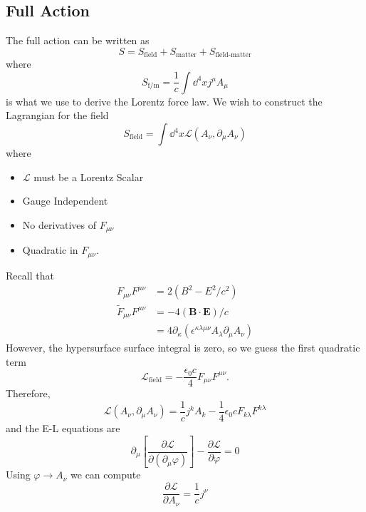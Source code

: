 \documentclass{article}
\numberwithin{equation}{section}
\begin{document}
\subsection{Full Action}
The full action can be written as 
\begin{equation}
    S = S_\text{field} + S_\text{matter} + S_\text{field-matter}
\end{equation}
where 
\begin{equation}
    S_\text{f/m} = \frac{1}{c} \int \dd^4 x j^\mu A_\mu
\end{equation}
is what we use to derive the Lorentz force law. We wish to construct the Lagrangian for the field 
\begin{equation}
    S_\text{field} = \int \dd^4 x \mathscr{L}(A_\nu, \partial_\mu A_\nu)
\end{equation}
where
\begin{itemize}
    \item $\mathscr{L}$ must be a Lorentz Scalar
    \item Gauge Independent
    \item No derivatives of $F_{\mu\nu}$
    \item Quadratic in $F_{\mu\nu}.$
\end{itemize}
Recall that
\begin{align}
    F_{\mu\nu}F^{\mu\nu} &= 2(B^2-E^2/c^2) \\ 
    \tilde{F}_{\mu\nu}F^{\mu\nu} &= - 4(\bm{B}\cdot \bm{E})/c \\ 
    &= 4\partial_\kappa (\epsilon^{\kappa \lambda \mu \nu} A_\lambda \partial_\mu A_\nu)
\end{align}
However, the hypersurface surface integral is zero, so we guess the first quadratic term
\begin{equation}
    \mathscr{L}_\text{field} = -\frac{\epsilon_0 c}{4} F_{\mu\nu}F^{\mu\nu}.
\end{equation}
Therefore,
\begin{equation}
    \boxed{\mathscr{L}(A_\nu, \partial_\mu A_\nu) = \frac{1}{c}j^k A_k - \frac{1}{4}\epsilon_0 c F_{k\lambda}F^{k\lambda}}
\end{equation}
and the E-L equations are
\begin{equation}
    \boxed{\partial_\mu \left[\frac{\partial \mathscr{L}}{\partial(\partial_\mu \varphi)}\right] - \frac{\partial\mathscr{L}}{\partial \varphi} = 0}
\end{equation}
Using $\varphi \to A_\nu$ we can compute 
\begin{equation}
    \frac{\partial \mathscr{L}}{\partial A_\nu} = \frac{1}{c}j^\nu
\end{equation}
\end{document}
